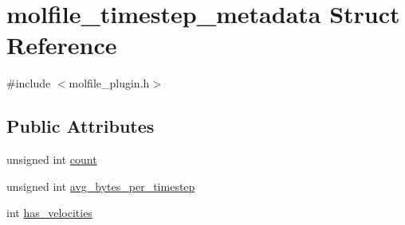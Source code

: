 \hypertarget{structmolfile__timestep__metadata}{\section{molfile\-\_\-timestep\-\_\-metadata \-Struct \-Reference}
\label{structmolfile__timestep__metadata}
}


{\ttfamily \#include $<$molfile\-\_\-plugin.\-h$>$}

\subsection*{\-Public \-Attributes}
\begin{DoxyCompactItemize}
\item 
unsigned int \hyperlink{structmolfile__timestep__metadata_af27ad1cef24c4ec748242067755c0814}{count}
\item 
unsigned int \hyperlink{structmolfile__timestep__metadata_a0ea761e7a9a1a413f1766b6912b91bd3}{avg\-\_\-bytes\-\_\-per\-\_\-timestep}
\item 
int \hyperlink{structmolfile__timestep__metadata_ad014d9264b7010ba7e34a0b7488c7463}{has\-\_\-velocities}
\end{DoxyCompactItemize}


